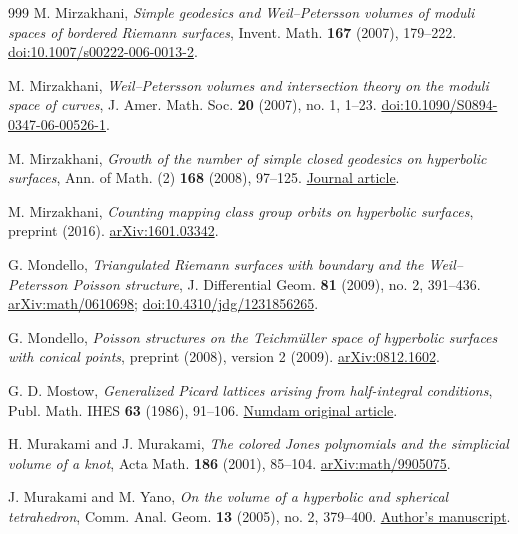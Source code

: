 \documentclass[11pt,a4paper]{article}
\numberwithin{equation}{section}
\theoremstyle{definition}
\theoremstyle{remark}
\begin{document}
\begin{thebibliography}{999}
M. Mirzakhani,
\emph{Simple geodesics and Weil--Petersson volumes of moduli spaces of
bordered Riemann surfaces},
Invent. Math. \textbf{167} (2007), 179--222.
\href{https://doi.org/10.1007/s00222-006-0013-2}{doi:10.1007/s00222-006-0013-2}.

M. Mirzakhani,
\emph{Weil--Petersson volumes and intersection theory on the moduli space
of curves}, J. Amer. Math. Soc. \textbf{20} (2007), no. 1, 1--23.
\href{https://doi.org/10.1090/S0894-0347-06-00526-1}{doi:10.1090/S0894-0347-06-00526-1}.

M. Mirzakhani,
\emph{Growth of the number of simple closed geodesics on hyperbolic surfaces},
Ann. of Math. (2) \textbf{168} (2008), 97--125.
\href{https://annals.math.princeton.edu/2008/168-1/p03}{Journal article}.

M. Mirzakhani,
\emph{Counting mapping class group orbits on hyperbolic surfaces},
preprint (2016).
\href{https://arxiv.org/abs/1601.03342}{arXiv:1601.03342}.

G. Mondello,
\emph{Triangulated Riemann surfaces with boundary and the Weil--Petersson
Poisson structure}, J. Differential Geom. \textbf{81} (2009), no. 2, 391--436.
\href{https://arxiv.org/abs/math/0610698}{arXiv:math/0610698};
\href{https://doi.org/10.4310/jdg/1231856265}{doi:10.4310/jdg/1231856265}.

G. Mondello,
\emph{Poisson structures on the Teichm\"uller space of hyperbolic
surfaces with conical points}, preprint (2008), version 2 (2009).
\href{https://arxiv.org/abs/0812.1602}{arXiv:0812.1602}.

G. D. Mostow,
\emph{Generalized Picard lattices arising from half-integral conditions},
Publ. Math. IHES \textbf{63} (1986), 91--106.
\href{https://www.numdam.org/item/PMIHES_1986__63__91_0/}{Numdam original article}.

H. Murakami and J. Murakami,
\emph{The colored Jones polynomials and the simplicial volume of a knot},
Acta Math. \textbf{186} (2001), 85--104.
\href{https://arxiv.org/abs/math/9905075}{arXiv:math/9905075}.

J. Murakami and M. Yano,
\emph{On the volume of a hyperbolic and spherical tetrahedron},
Comm. Anal. Geom. \textbf{13} (2005), no. 2, 379--400.
\href{https://murakami.w.waseda.jp/papers/tetrahedronrev3.pdf}{Author's manuscript}.


\end{thebibliography}
\end{document}
